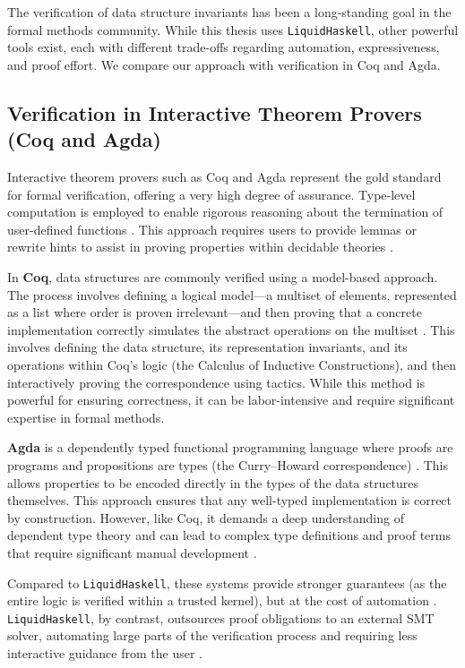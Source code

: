 The verification of data structure invariants has been a long-standing goal in the formal methods community.
While this thesis uses \texttt{LiquidHaskell}, other powerful tools exist, each with different trade-offs regarding automation, expressiveness, and proof effort.
We compare our approach with verification in Coq and Agda.

\subsection{Verification in Interactive Theorem Provers (Coq and Agda)}

Interactive theorem provers such as Coq and Agda represent the gold standard for formal verification, offering a very high degree of assurance.
Type-level computation is employed to enable rigorous reasoning about the termination of user-defined functions \cite{vazou2018}.
This approach requires users to provide lemmas or rewrite hints to assist in proving properties within decidable theories \cite{vazou2018}.

In \textbf{Coq}, data structures are commonly verified using a model-based approach.
The process involves defining a logical model---a multiset of elements, represented as a list where order is proven irrelevant---and then proving that a concrete implementation correctly simulates the abstract operations on the multiset \cite{VerifiedFunctional}.
This involves defining the data structure, its representation invariants, and its operations within Coq's logic (the Calculus of Inductive Constructions), and then interactively proving the correspondence using tactics.
While this method is powerful for ensuring correctness, it can be labor-intensive and require significant expertise in formal methods.

\textbf{Agda} is a dependently typed functional programming language where proofs are programs and propositions are types (the Curry–Howard correspondence) \cite{agda-doc}.
This allows properties to be encoded directly in the types of the data structures themselves.
This approach ensures that any well-typed implementation is correct by construction.
However, like Coq, it demands a deep understanding of dependent type theory and can lead to complex type definitions and proof terms that require significant manual development \cite{vazou2018}.

Compared to \texttt{LiquidHaskell}, these systems provide stronger guarantees (as the entire logic is verified within a trusted kernel), but at the cost of automation \cite{vazou2018}.
\texttt{LiquidHaskell}, by contrast, outsources proof obligations to an external SMT solver, automating large parts of the verification process and requiring less interactive guidance from the user \cite{vazou2014}.
